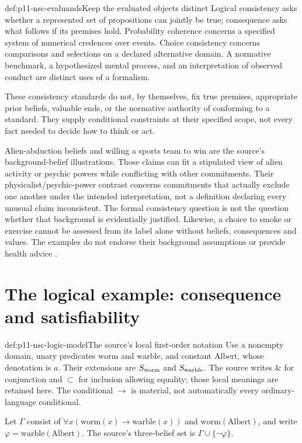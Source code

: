 \begin{hbdefinition}{def:p11-nsc-evaluands}{Keep the evaluated objects distinct}
Logical consistency asks whether a represented set of propositions can
jointly be true; consequence asks what follows if its premises hold.
Probability coherence concerns a specified system of numerical credences
over events. Choice consistency concerns comparisons and selections on
a declared alternative domain. A normative benchmark, a hypothesized
mental process, and an interpretation of observed conduct are distinct
uses of a formalism.

These consistency standards do not, by themselves, fix true premises,
appropriate prior beliefs, valuable ends, or the normative authority of
conforming to a standard. They supply conditional constraints at their
specified scope, not every fact needed to decide how to think or act.
\end{hbdefinition}

Alien-abduction beliefs and willing a sports team to win are the source's
background-belief illustrations. Those claims can fit a stipulated view
of alien activity or psychic powers while conflicting with other commitments.
Their physicalist/psychic-power contrast concerns commitments that actually
exclude one another under the intended interpretation, not a definition
declaring every unusual claim inconsistent. The formal consistency question
is not the question whether that background
is evidentially justified. Likewise, a choice to smoke or exercise cannot
be assessed from its label alone without beliefs, consequences and values.
The examples do not endorse their background assumptions or provide
health advice \cite[p.~12]{ChaterOaksford2012NormativeSystems}.

\section{The logical example: consequence and satisfiability}
\label{sec:p11-nsc-logic}

\begin{hbconvention}{def:p11-nsc-logic-model}{The source's local first-order notation}
Use a nonempty domain, unary predicates \(\mathrm{worm}\) and
\(\mathrm{warble}\), and constant \(\mathrm{Albert}\), whose denotation
is \(a\). Their extensions are \(S_{\rm worm}\) and
\(S_{\rm warble}\). The source writes \(\&\) for conjunction and
\(\subset\) for inclusion allowing equality; those local meanings are
retained here. The conditional \(\to\) is material, not automatically
every ordinary-language conditional.

Let \(\Gamma\) consist of
\(\forall x(\mathrm{worm}(x)\to\mathrm{warble}(x))\) and
\(\mathrm{worm}(\mathrm{Albert})\), and write
\(\varphi=\mathrm{warble}(\mathrm{Albert})\).
The source's three-belief set is \(\Gamma\cup\{\neg\varphi\}\).
\end{hbconvention}

